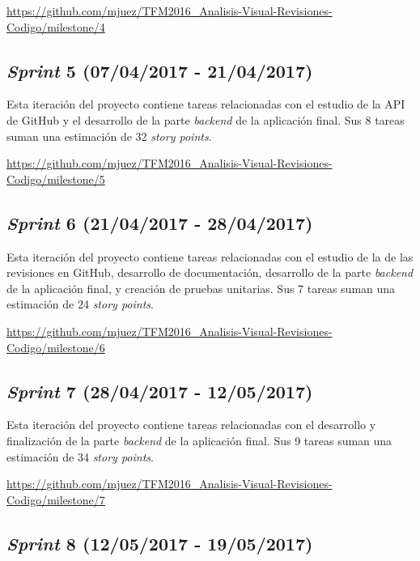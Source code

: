 \url{https://github.com/mjuez/TFM2016_Analisis-Visual-Revisiones-Codigo/milestone/4}


\subsection{\emph{Sprint} 5 (07/04/2017 - 21/04/2017)}

Esta iteración del proyecto contiene tareas relacionadas con el estudio de la API de GitHub y el desarrollo de la parte \emph{backend} de la aplicación final. Sus 8 tareas suman una estimación de 32 \emph{story points}.

\url{https://github.com/mjuez/TFM2016_Analisis-Visual-Revisiones-Codigo/milestone/5}


\subsection{\emph{Sprint} 6 (21/04/2017 - 28/04/2017)}

Esta iteración del proyecto contiene tareas relacionadas con el estudio de la de las revisiones en GitHub, desarrollo de documentación, desarrollo de la parte \emph{backend} de la aplicación final, y creación de pruebas unitarias. Sus 7 tareas suman una estimación de 24 \emph{story points}.

\url{https://github.com/mjuez/TFM2016_Analisis-Visual-Revisiones-Codigo/milestone/6}


\subsection{\emph{Sprint} 7 (28/04/2017 - 12/05/2017)}

Esta iteración del proyecto contiene tareas relacionadas con el desarrollo y finalización de la parte \emph{backend} de la aplicación final. Sus 9 tareas suman una estimación de 34 \emph{story points}.

\url{https://github.com/mjuez/TFM2016_Analisis-Visual-Revisiones-Codigo/milestone/7}


\subsection{\emph{Sprint} 8 (12/05/2017 - 19/05/2017)}

